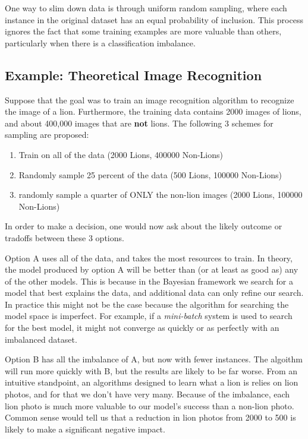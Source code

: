 \documentclass[twoside]{article}
\begin{document}
One way to slim down data is through uniform random sampling, where each instance in the original dataset has an equal probability of inclusion. This process ignores the fact that some training examples are more valuable than others, particularly when there is a classification imbalance.

\subsection{Example: Theoretical Image Recognition}

Suppose that the goal was to train an image recognition algorithm to recognize the image of a lion. Furthermore, the training data contains 2000 images of lions, and about 400,000 images that are \textbf{not} lions. The following 3 schemes for sampling are proposed:

\begin{enumerate}[label=(\Alph*)]
\item Train on all of the data (2000 Lions, 400000 Non-Lions)
\item Randomly sample 25 percent of the data (500 Lions, 100000 Non-Lions)
\item  randomly sample a quarter of ONLY the non-lion images (2000 Lions, 100000 Non-Lions)
\end{enumerate}

In order to make a decision, one would now ask about the likely outcome or tradoffs between these 3 options.

Option A uses all of the data, and takes the most resources to train. In theory, the model produced by option A will be better than (or at least as good as) any of the other models. This is because in the Bayesian framework we search for a model that best explains the data, and additional data can only refine our search. In practice this might not be the case because the algorithm for searching the model space is imperfect. For example, if a \textit{mini-batch} system is used to search for the best model, it might not converge as quickly or as perfectly with an imbalanced dataset.

Option B has all the imbalance of A, but now with fewer instances. The algoithm will run more quickly with B, but the results are likely to be far worse. From an intuitive standpoint, an algorithms designed to learn what a lion is relies on lion photos, and for that we don't have very many. Because of the imbalance, each lion photo is much more valuable to our model's success than a non-lion photo. Common sense would tell us that a reduction in lion photos from 2000 to 500 is likely to make a significant negative impact.
\end{document}

